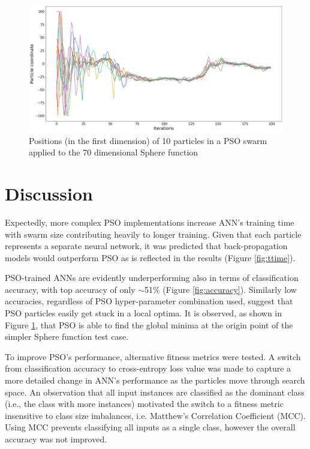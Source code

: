\documentclass[12pt]{article}
\begin{document}
\begin{figure}[H]
  \centering
  \includegraphics[width=1\textwidth]{figs/sphere_pso.png}
  \caption{Positions (in the first dimension) of 10 particles in a PSO swarm applied to the 70 dimensional Sphere function}
  \label{fig:sphere}
\end{figure}

\vspace{-1.5em}
\section{Discussion}
\vspace{-1.5em}

Expectedly, more complex PSO implementations increase ANN's training time with swarm size contributing heavily to longer training. Given that each particle represents a separate neural network, it was predicted that back-propagation models would outperform PSO as is reflected in the results (Figure \ref{fig:ttime}). 

PSO-trained ANNs are evidently underperforming also in terms of classification accuracy, with top accuracy of only  $\sim$51\%  (Figure \ref{fig:accuracy}). Similarly low accuracies, regardless of PSO hyper-parameter combination used, suggest that PSO particles easily get stuck in a local optima. It is observed, as shown in Figure \ref{fig:sphere}, that PSO is able to find the global minima at the origin point of the simpler Sphere function test case.

To improve PSO's performance, alternative fitness metrics were tested. A switch from classification accuracy to cross-entropy loss value was made to capture a more detailed change in ANN's performance as the particles move through search space.  An observation that all input instances are classified as the dominant class (i.e., the class with more instances) motivated the switch to a fitness metric insensitive to class size  imbalances, i.e. Matthew's Correlation Coefficient (MCC). Using MCC prevents classifying all inputs as a single class, however the overall accuracy was not improved.
\end{document}
